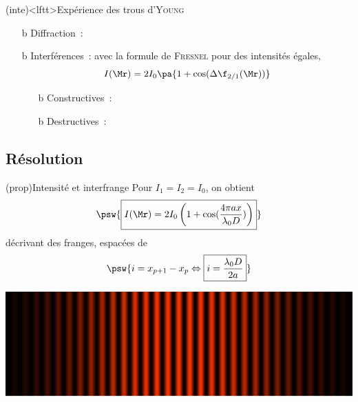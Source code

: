 \documentclass[../../main/main.tex]{subfiles}
\begin{document}
\begin{tcb*}(inte)<lftt>{Expérience des trous d'\textsc{Young}}
	\begin{itemize}
		\item[b]{Diffraction}~:
		\item[b]{Interférences}~:
		      avec la formule de \textsc{Fresnel} pour des intensités égales,
		      \[
			      I(\Mr) = 2I_0 \pa{1+\cos(\Delta{\f}_{2/1}(\Mr))}
		      \]
		      \begin{itemize}
			      \item[b]{Constructives}~:
			      \item[b]{Destructives}~:
		      \end{itemize}
	\end{itemize}
	\vspace{-15pt}
\end{tcb*}


\subsection{Résolution}
\begin{tcb*}[sidebyside, righthand ratio=.5](prop){Intensité et interfrange}
	Pour $I_1 = I_2 = I_0$, on obtient
	\[
		\psw{%
			\boxed{I(\Mr) = 2I_0 \left( 1 + \cos (\frac{4\pi ax}{\lambda_0 D}) \right)}
		}
	\]
	décrivant des franges, espacées de
	\[
		\psw{%
			i = x_{p+1} - x_p \Leftrightarrow \boxed{i = \frac{\lambda_0 D}{2a}}
		}
	\]
	\tcblower
	\begin{center}
		\includegraphics[width=\linewidth]{young_intensity}
	\end{center}
\end{tcb*}
\end{document}
